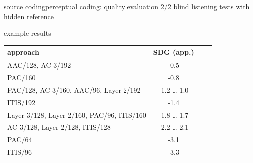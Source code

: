 	\begin{frame}{source coding}{perceptual coding: quality evaluation 2/2}
		blind listening tests with hidden reference
		
		\pause		
		example results
		\begin{table}
			\begin{center}
			\begin{footnotesize}
				\begin{tabular}{lccc}
				\hline
					\textbf{approach} & \textbf{SDG (app.)} \\
				\hline
				AAC/128, AC-3/192	& -0.5\\
				PAC/160	& -0.8\\
				PAC/128, AC-3/160, AAC/96, Layer 2/192	& -1.2 \ldots -1.0\\
				ITIS/192 	& -1.4\\
				Layer 3/128, Layer 2/160, PAC/96, ITIS/160 	& -1.8 \ldots -1.7\\
				AC-3/128, Layer 2/128, ITIS/128 	&  -2.2 \ldots -2.1\\
				PAC/64 	& -3.1\\
				ITIS/96 	& -3.3\\
				\end{tabular}  
			\end{footnotesize}
			\end{center}
		\end{table}
	\end{frame}		

